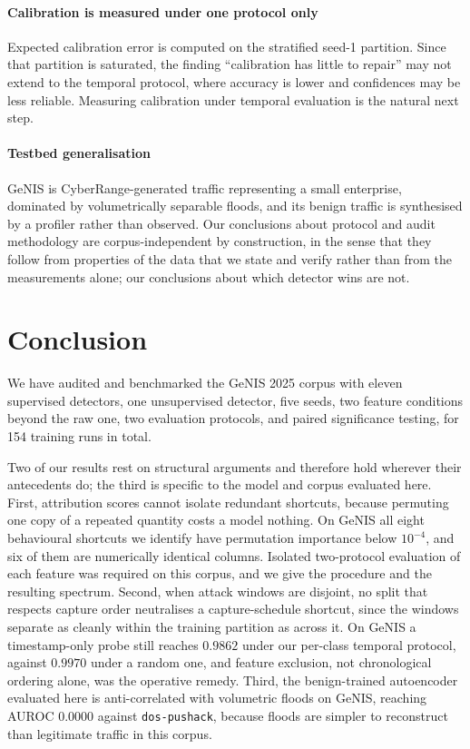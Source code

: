 \documentclass[review,12pt]{elsarticle}
\begin{document}
\paragraph{Calibration is measured under one protocol only}
Expected calibration error is computed on the stratified seed-1 partition. Since that
partition is saturated, the finding ``calibration has little to repair'' may not extend
to the temporal protocol, where accuracy is lower and confidences may be less reliable.
Measuring calibration under temporal evaluation is the natural next step.

\paragraph{Testbed generalisation}
GeNIS is CyberRange-generated traffic representing a small enterprise, dominated by
volumetrically separable floods, and its benign traffic is synthesised by a profiler
rather than observed. Our conclusions about protocol and audit methodology are
corpus-independent by construction, in the sense that they follow from properties of the
data that we state and verify rather than from the measurements alone; our conclusions
about which detector wins are not.

\section{Conclusion}
\label{sec:conclusion}

We have audited and benchmarked the GeNIS 2025 corpus with eleven supervised detectors,
one unsupervised detector, five seeds, two feature conditions beyond the raw one, two
evaluation protocols, and paired significance testing, for 154 training runs in total.

Two of our results rest on structural arguments and therefore hold wherever their
antecedents do; the third is specific to the model and corpus evaluated here. First,
attribution scores cannot isolate redundant shortcuts, because permuting one copy of a
repeated quantity costs a model nothing. On GeNIS all eight behavioural shortcuts we
identify have permutation importance below $10^{-4}$, and six of them are numerically
identical columns. Isolated two-protocol evaluation of each feature was required on this
corpus, and we give the procedure and the resulting spectrum. Second, when attack windows
are disjoint, no split that respects capture order neutralises a capture-schedule
shortcut, since the windows separate as cleanly within the training partition as across
it. On GeNIS a timestamp-only probe still reaches $0.9862$ under our per-class temporal
protocol, against $0.9970$ under a random one, and feature exclusion, not chronological
ordering alone, was the operative remedy. Third, the benign-trained autoencoder evaluated
here is anti-correlated with volumetric floods on GeNIS, reaching AUROC $0.0000$ against
\texttt{dos-pushack}, because floods are simpler to reconstruct than legitimate traffic in
this corpus.
\end{document}
